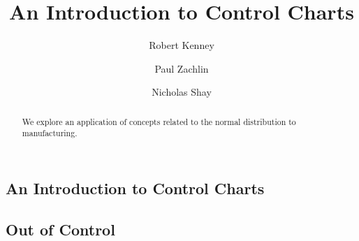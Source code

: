 \documentclass{ximera}
\author{Robert Kenney \and Paul Zachlin \and Nicholas Shay}
\title{An Introduction to Control Charts} \license{CC BY-NC-SA 4.0}
\begin{document}
\begin{abstract}
We explore an application of concepts related to the normal distribution to manufacturing.
\end{abstract}
\maketitle

\begin{onlineOnly}
\section*{An Introduction to Control Charts}
\end{onlineOnly}

\subsection*{Out of Control}
\end{document}
